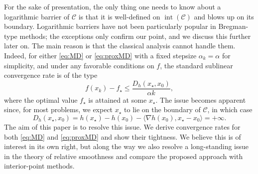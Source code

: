 \documentclass[a4paper]{article}
\renewcommand{\leq}{\leqslant}
\newcommand{\CC}{\mathcal{C}}
\newcommand{\ip}[2]{\langle #1, #2\rangle}
\DeclareMathOperator{\inter}{int}
\begin{document}
For the sake of presentation, the only thing one needs to know about a logarithmic barrier of $\CC$ is that it is well-defined on $\inter(\CC)$ and blows up on its boundary.
Logarithmic barriers have not been particularly popular in Bregman-type methods; the exceptions only confirm our point, and we discuss this further later on.
The main reason is that the classical analysis cannot handle them.
Indeed, for either \eqref{eq:MD} or \eqref{eq:proxMD} with a fixed stepsize $\alpha_k=\alpha$ for simplicity, and under any favorable conditions on $f$, the standard sublinear convergence rate is of the type
\[
        f(x_k) - f_\star \leq \frac{D_h(x_\star, x_0)}{\alpha k},
\]
where the optimal value $f_\star$ is attained at some $x_\star$.
The issue becomes apparent since, for most problems, we expect $x_\star$ to lie on the boundary of $\CC$, in which case
\[
D_h(x_\star,x_0) = h(x_\star) - h(x_0) - \ip{\nabla h(x_0)}{x_\star-x_0} = +\infty.
\]
The aim of this paper is to resolve this issue. We derive convergence rates for both \eqref{eq:MD} and \eqref{eq:proxMD} and show their tightness.
We believe this is of interest in its own right, but along the way we also resolve a long-standing issue in the theory of relative smoothness and compare the proposed approach with interior-point methods.
\end{document}
